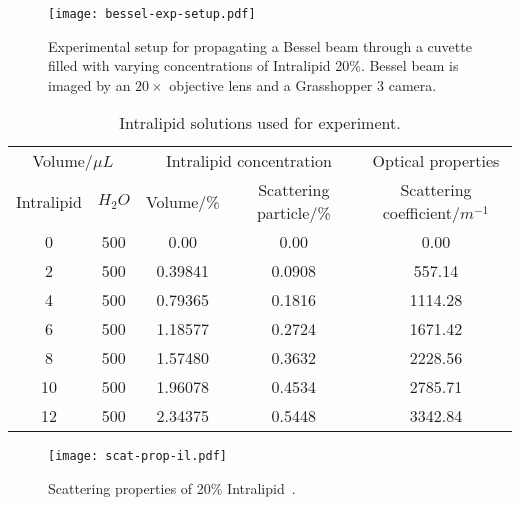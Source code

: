 \begin{figure}[ht!]
    \centering
    \texttt{[image: bessel-exp-setup.pdf]}
    \caption{Experimental setup for propagating a Bessel beam through a cuvette filled with varying concentrations of Intralipid 20\%. Bessel beam is imaged by an $20\times$ objective lens and a Grasshopper 3 camera.}
    \label{fig:expsetup}
\end{figure}


\begin{table}[!ht]
    \begin{tabular}{cc|cc|c}
        \hline
        \multicolumn{2}{c|}{Volume/$\mu L$} & \multicolumn{2}{c|}{Intralipid concentration}                       & Optical properties              \\
        Intralipid                & $H_2O$  & Volume/\%      & Scattering particle/\%                             & Scattering coefficient/$m^{-1}$ \\ \hline
        \multicolumn{1}{c|}{0}    & 500     & \multicolumn{1}{c|}{0.00}    & 0.00                                 & 0.00                            \\
        \multicolumn{1}{c|}{2}    & 500     & \multicolumn{1}{c|}{0.39841} & 0.0908                               & 557.14                          \\
        \multicolumn{1}{c|}{4}    & 500     & \multicolumn{1}{c|}{0.79365} & 0.1816                               & 1114.28                         \\
        \multicolumn{1}{c|}{6}    & 500     & \multicolumn{1}{c|}{1.18577} & 0.2724                               & 1671.42                         \\
        \multicolumn{1}{c|}{8}    & 500     & \multicolumn{1}{c|}{1.57480} & 0.3632                               & 2228.56                         \\
        \multicolumn{1}{c|}{10}   & 500     & \multicolumn{1}{c|}{1.96078} & 0.4534                               & 2785.71                         \\
        \multicolumn{1}{c|}{12}   & 500     & \multicolumn{1}{c|}{2.34375} & 0.5448                               & 3342.84                         \\ \hline
    \end{tabular}
    \caption{Intralipid solutions used for experiment.}
    \label{tab:intra}
\end{table}

\begin{figure}[!ht]
    \centering
    \texttt{[image: scat-prop-il.pdf]}
    \caption{Scattering properties of 20\% Intralipid~\cite{michels2008optical}.}
    \label{fig:ilscatprop}
    \vspace{-10pt}
\end{figure}

